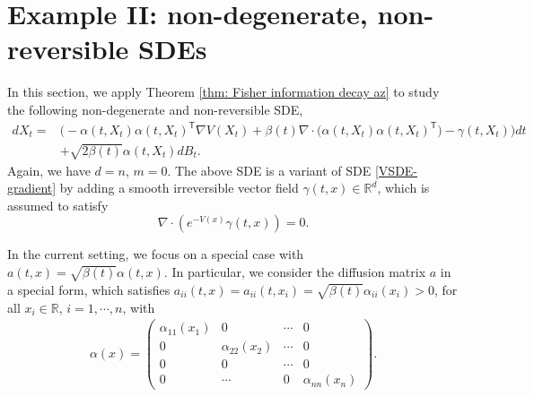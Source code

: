 \documentclass[11pt,reqno]{amsart}
\newcommand{\ts}{\mathsf{T}}
\newcommand{\bea}{\begin{eqnarray}}
\newcommand{\eea}{\end{eqnarray}}
\begin{document}
\section{Example II: non-degenerate, non-reversible SDEs}\label{sec5}
In this section, we apply Theorem \ref{thm: Fisher information decay az} to study the following non-degenerate and non-reversible SDE,
\begin{equation}\label{VSDE}
\begin{split}
    dX_t=&\Big(-\alpha(t,X_t)\alpha(t,X_t)^{\ts}\nabla V(X_t)+\beta(t)\nabla\cdot\Big(\alpha(t,X_t)\alpha(t,X_t)^{\ts}\Big)-\gamma(t,X_t)\Big)dt\\
    &+\sqrt{2\beta(t)} \alpha(t,X_t) dB_t. 
    \end{split}
\end{equation}
Again, we have $d=n$, $m=0$. The above SDE is a variant of SDE \eqref{VSDE-gradient} by adding a smooth irreversible vector field $\gamma(t,x)\in{\mathbb R}^d$, which is assumed to satisfy  
\begin{equation*}
 \nabla\cdot(e^{-V(x)}\gamma(t,x))=0.    
\end{equation*}


In the current setting, we focus on a special case with $a(t,x)=\sqrt{\beta(t)}\alpha(t,x)$. In particular, we consider the diffusion matrix $a$ in a special form, which satisfies $a_{ii}(t,x)=a_{ii}(t, x_i)=\sqrt{\beta(t)}\alpha_{ii}(x_i)>0$, for all $x_i\in \mathbb{R}$, $i=1,\cdots,n$, with   
\bea \label{non degenerate a}
\alpha(x)=\begin{pmatrix}\alpha_{11}(x_1)&0&\cdots&0\\
0&\alpha_{22}(x_2)&\cdots&0\\
0 &0&\cdots&0\\
0&\cdots&0&\alpha_{nn}(x_n)
\end{pmatrix}.
\eea 
\end{document}
